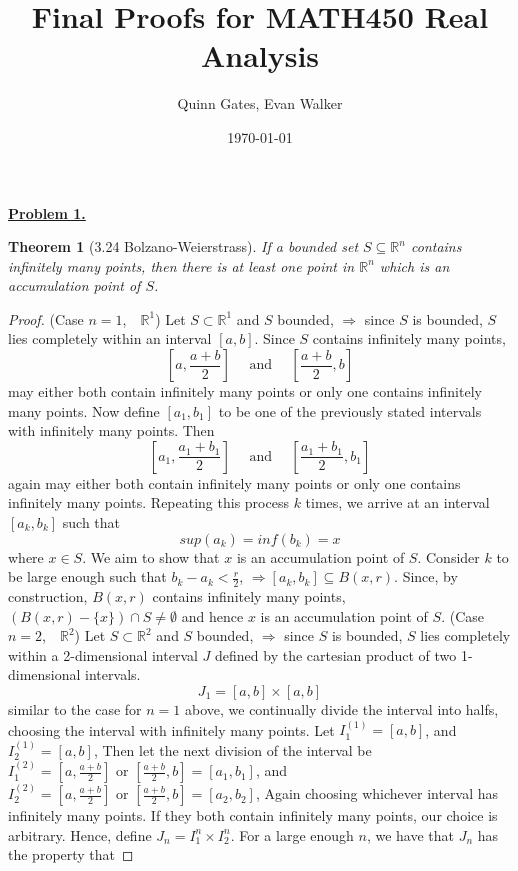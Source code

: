 \documentclass[aps,pra,notitlepage,amsmath,amssymb,letterpaper,12pt]{revtex4-1}
\newtheorem{theorem}{Theorem}
\begin{document}
\title{Final Proofs for MATH450 Real Analysis}
\author{Quinn Gates, Evan Walker}
\date{\today}

\maketitle

\underline{\textbf{Problem 1.}}
\begin{theorem}[3.24 Bolzano-Weierstrass]
If a bounded set $S \subseteq \mathbb{R}^n$ contains infinitely many points, then there is at least one point in $\mathbb{R}^n$ which is an accumulation point of $S$.
\end{theorem}

\begin{proof}
(Case $n=1$,$\quad \mathbb{R}^{1}$)
Let $S \subset \mathbb{R}^{1}$ and $S$ bounded, $\Rightarrow$ since $S$ is bounded, $S$ lies completely within an interval $[a,b]$. Since $S$ contains infinitely many points,
$$[a,\frac{a+b}{2}] \quad \textrm{ and }  \quad [\frac{a+b}{2},b]$$
may either both contain infinitely many points or only one contains infinitely many points. Now define $[a_{1},b_{1}]$ to be one of the previously stated intervals with infinitely many points. Then
$$[a_{1},\frac{a_{1}+b_{1}}{2}] \quad \textrm{ and }  \quad [\frac{a_{1}+b_{1}}{2},b_{1}]$$
again may either both contain infinitely many points or only one contains infinitely many points. Repeating this process $k$ times, we arrive at an interval $[a_{k},b_{k}]$
such that $$sup(a_{k}) = inf(b_{k}) = x$$ where $x \in S$. We aim to show that $x$ is an accumulation point of $S$. Consider $k$ to be large enough such that $b_{k} - a_{k} < \frac{r}{2}$, $\Rightarrow [a_{k},b_{k}] \subseteq B(x,r)$. Since, by construction, $B(x,r)$ contains infinitely many points, $(B(x,r) - \{x\}) \cap S \ne \emptyset$ and hence $x$ is an accumulation point of $S$.
\newline{}
\newline{}
(Case $n=2$,$\quad \mathbb{R}^{2}$) Let $S \subset \mathbb{R}^{2}$ and $S$ bounded, $\Rightarrow$ since $S$ is bounded, $S$ lies completely within a 2-dimensional interval $J$ defined by the cartesian product of two 1-dimensional intervals.
$$J_{1} = [a,b] \times [a,b]$$
similar to the case for $n=1$ above, we continually divide the interval into halfs, choosing the interval with infinitely many points. Let $I_{1}^{(1)} = [a,b]$, and $I_{2}^{(1)} = [a,b]$, Then let the next division of the interval be $I_{1}^{(2)} = [a,\frac{a+b}{2}] \textrm{ or } [\frac{a+b}{2},b] = [a_{1},b_{1}]$, and $I_{2}^{(2)} = [a,\frac{a+b}{2}] \textrm{ or } [\frac{a+b}{2},b] = [a_{2},b_{2}]$, Again choosing whichever interval has infinitely many points. If they both contain infinitely many points, our choice is arbitrary. Hence, define $J_{n} = I_{1}^{n} \times I_{2}^{n}$. For a large enough $n$, we have that $J_{n}$ has the property that

\end{proof}
\end{document}
